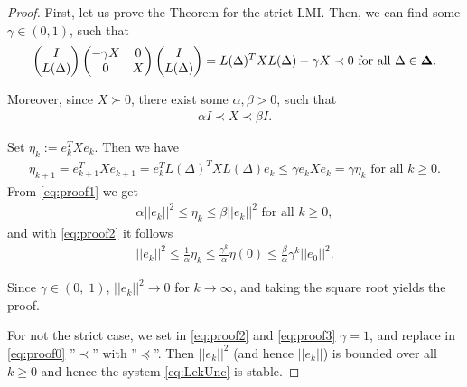 \begin{proof}
	First, let us prove the Theorem for the strict LMI. Then, we can find some $\gamma \in (0,1)$, such that
	\begin{align}
	\label{eq:proof0}
	\begin{pmatrix}
	I \\ L(\Delta)
	\end{pmatrix}
	\begin{pmatrix}
	-\gamma X & 0 \\ 0 & X
	\end{pmatrix}
	\begin{pmatrix}
	I \\ L(\Delta)
	\end{pmatrix} = L(\Delta)^T X L(\Delta) - \gamma X \prec 0 \text{ for all } \Delta \in \mathbf{\Delta}.
	\end{align}	
	

	Moreover, since $X \succ 0$, there exist some $\alpha, \beta > 0$, such that 
	\begin{align}
	\label{eq:proof1}
	\alpha I \prec X \prec \beta I.
	\end{align}
	
	Set $\eta_k := e_k^T X e_k$. Then we have
	\begin{align}
	\label{eq:proof2}
	\eta_{k+1} = e_{k+1}^T X e_{k+1} = e_k^T L(\Delta)^T X L(\Delta) e_k \leq \gamma e_k X e_k = \gamma \eta_k \text{ for all } k\geq 0.
	\end{align}
    From \eqref{eq:proof1} we get
	\begin{align}
	\alpha || e_k ||^2 \leq \eta_k \leq \beta ||e_k||^2 \text{ for all } k\geq 0,
	\end{align}
	and with \eqref{eq:proof2} it follows
	\begin{align}
	\label{eq:proof3}
	||e_k||^2 \leq \frac{1}{\alpha}\eta_k \leq \frac{\gamma^k}{\alpha}\eta(0) \leq \frac{\beta}{\alpha} \gamma^k ||e_0||^2. 
	\end{align}
	
	
	Since $\gamma \in (0,\;1)$, $||e_k||^2 \to 0$ for $k \to \infty$, and taking the square root yields the proof. 
	
	For not the strict case, we set in \eqref{eq:proof2} and \eqref{eq:proof3} $\gamma = 1$, and replace in \eqref{eq:proof0} ''$\prec$'' with ''$\preceq$''. Then $||e_k||^2$ (and hence $||e_k||$) is bounded over all $k\geq 0$ and hence the system \eqref{eq:LekUnc} is stable. 
	
\end{proof}

